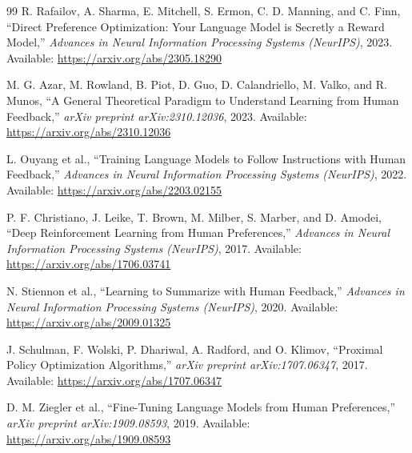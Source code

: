 \documentclass[11pt,a4paper]{article}
\begin{document}
\begin{thebibliography}{99}
R. Rafailov, A. Sharma, E. Mitchell, S. Ermon, C. D. Manning, and C. Finn,
``Direct Preference Optimization: Your Language Model is Secretly a Reward Model,''
\textit{Advances in Neural Information Processing Systems (NeurIPS)}, 2023.
Available: \url{https://arxiv.org/abs/2305.18290}

M. G. Azar, M. Rowland, B. Piot, D. Guo, D. Calandriello, M. Valko, and R. Munos,
``A General Theoretical Paradigm to Understand Learning from Human Feedback,''
\textit{arXiv preprint arXiv:2310.12036}, 2023.
Available: \url{https://arxiv.org/abs/2310.12036}

L. Ouyang et al.,
``Training Language Models to Follow Instructions with Human Feedback,''
\textit{Advances in Neural Information Processing Systems (NeurIPS)}, 2022.
Available: \url{https://arxiv.org/abs/2203.02155}

P. F. Christiano, J. Leike, T. Brown, M. Milber, S. Marber, and D. Amodei,
``Deep Reinforcement Learning from Human Preferences,''
\textit{Advances in Neural Information Processing Systems (NeurIPS)}, 2017.
Available: \url{https://arxiv.org/abs/1706.03741}

N. Stiennon et al.,
``Learning to Summarize with Human Feedback,''
\textit{Advances in Neural Information Processing Systems (NeurIPS)}, 2020.
Available: \url{https://arxiv.org/abs/2009.01325}

J. Schulman, F. Wolski, P. Dhariwal, A. Radford, and O. Klimov,
``Proximal Policy Optimization Algorithms,''
\textit{arXiv preprint arXiv:1707.06347}, 2017.
Available: \url{https://arxiv.org/abs/1707.06347}

D. M. Ziegler et al.,
``Fine-Tuning Language Models from Human Preferences,''
\textit{arXiv preprint arXiv:1909.08593}, 2019.
Available: \url{https://arxiv.org/abs/1909.08593}

\end{thebibliography}
\end{document}
